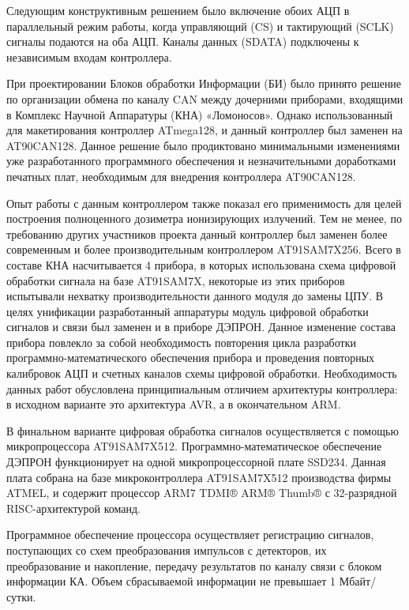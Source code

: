 Следующим конструктивным решением было включение обоих АЦП в параллельный режим работы, когда управляющий (CS) и тактирующий (SCLK) сигналы подаются на оба АЦП. Каналы данных (SDATA) подключены к независимым входам контроллера. 


При проектировании Блоков обработки Информации (БИ) было принято решение по организации обмена по каналу CAN между дочерними приборами, входящими в Комплекс Научной Аппаратуры (КНА) «Ломоносов». Однако использованный для макетирования контроллер ATmega128, и данный контроллер был заменен на AT90CAN128. Данное решение было продиктовано минимальными изменениями уже разработанного программного обеспечения и незначительными доработками печатных плат, необходимым для внедрения контроллера AT90CAN128.

Опыт работы с данным контроллером также показал его применимость для целей построения полноценного дозиметра ионизирующих излучений. Тем не менее, по требованию других участников проекта данный контроллер был заменен более современным и более производительным контроллером AT91SAM7X256. Всего в составе КНА насчитывается 4 прибора, в которых использована схема цифровой обработки сигнала на базе AT91SAM7X, некоторые из этих приборов испытывали нехватку производительности данного модуля до замены ЦПУ. В целях унификации разработанный аппаратуры модуль цифровой обработки сигналов и связи был заменен и в приборе ДЭПРОН. Данное изменение состава прибора повлекло за собой необходимость повторения цикла разработки программно-математического обеспечения прибора и проведения повторных калибровок АЦП и счетных каналов схемы цифровой обработки. Необходимость данных работ обусловлена принципиальным отличием архитектуры контроллера: в исходном варианте это архитектура AVR, а в окончательном ARM. 

В финальном варианте цифровая обработка сигналов осуществляется с помощью микропроцессора AT91SAM7X512. Программно-математическое обеспечение ДЭПРОН функционирует на одной микропроцессорной плате SSD234. Данная плата собрана на базе микроконтроллера AT91SAM7X512 производства фирмы ATMEL, и содержит процессор ARM7 TDMI® ARM® Thumb® с 32-разрядной RISC-архитектурой команд.

Программное обеспечение процессора осуществляет регистрацию сигналов, поступающих со схем преобразования импульсов с детекторов, их преобразование и накопление, передачу результатов по каналу связи с блоком информации КА. Объем сбрасываемой информации не превышает 1 Мбайт/сутки.

